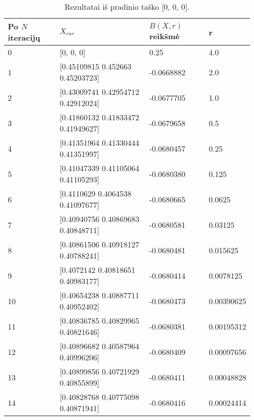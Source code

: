 \documentclass[a4paper,12pt,fleqn]{article}
\begin{document}
\begin{table}[H]
\centering
\caption{Rezultatai iš pradinio taško [0, 0, 0].}
\def\arraystretch{1.2}
\setlength{\tabcolsep}{0.8em}
\begin{tabular}{l l l l}
\hline\hline
Po $N$ iteracijų & $X_{cur}$ & $B(X, r)$ reikšmė & r \\ [0.5ex]
\hline
0 & [0, 0, 0] & 0.25 & 4.0 \\
1 & [0.45109815 0.452663 0.45203723]   & -0.0668882 & 2.0 \\
2 & [0.43009741 0.42954712 0.42912024] & -0.0677705 & 1.0 \\
3 & [0.41860132 0.41833472 0.41949627] & -0.0679658 & 0.5 \\
4 & [0.41351964 0.41330444 0.41351997] & -0.0680457 & 0.25 \\
5 & [0.41047339 0.41105064 0.41105293] & -0.0680380 & 0.125 \\
6 & [0.4110629 0.4064538 0.41097677]   & -0.0680665 & 0.0625 \\
7 & [0.40940756 0.40869683 0.40848711] & -0.0680581 & 0.03125 \\
8 & [0.40861506 0.40918127 0.40788241] & -0.0680481 & 0.015625 \\
9 & [0.4072142 0.40818651 0.40983177]  & -0.0680414 & 0.0078125 \\
10 & [0.40654238 0.40887711 0.40952402] & -0.0680473 & 0.00390625 \\
11 & [0.40836785 0.40829965 0.40821646] & -0.0680381 & 0.00195312 \\
12 & [0.40896682 0.40587964 0.40996206] & -0.0680409 & 0.00097656 \\
13 & [0.40899856 0.40721929 0.40855899] & -0.0680411 & 0.00048828 \\
14 & [0.40828768 0.40775098 0.40871941] & -0.0680416 & 0.00024414 \\
\hline
\end{tabular}
\label{table:baudos_funkcijos_iteracijos}
\end{table}
\end{document}
